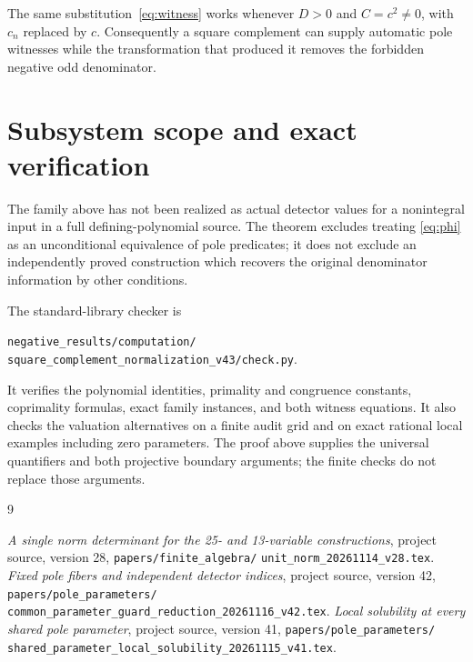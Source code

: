 \documentclass[11pt,a4paper]{article}
\begin{document}
The same substitution~\eqref{eq:witness} works whenever $D>0$ and
$C=c^2\ne0$, with $c_n$ replaced by $c$. Consequently a square
complement can supply automatic pole witnesses while the transformation
that produced it removes the forbidden negative odd denominator.

\newpage
\section{Subsystem scope and exact verification}

The family above has not been realized as actual detector values for a
nonintegral input in a full defining-polynomial source. The theorem
excludes treating \eqref{eq:phi} as an unconditional equivalence of pole
predicates; it does not exclude an independently proved construction
which recovers the original denominator information by other conditions.

The standard-library checker is
\begin{center}\small
\texttt{negative\_results/computation/}\\
\texttt{square\_complement\_normalization\_v43/check.py}.
\end{center}
It verifies the polynomial identities, primality and congruence
constants, coprimality formulas, exact family instances, and both witness
equations. It also checks the valuation alternatives on a finite audit
grid and on exact rational local examples including zero parameters.
The proof above supplies the universal quantifiers and both projective
boundary arguments; the finite checks do not replace those arguments.

\begin{thebibliography}{9}
\raggedright
{}
\emph{A single norm determinant for the 25- and 13-variable constructions},
project source, version 28,
\texttt{papers/finite\_algebra/}\allowbreak
\texttt{unit\_norm\_20261114\_v28.tex}.
\emph{Fixed pole fibers and independent detector indices},
project source, version 42,
\texttt{papers/pole\_parameters/}\allowbreak
\texttt{common\_parameter\_guard\_reduction\_20261116\_v42.tex}.
\emph{Local solubility at every shared pole parameter},
project source, version 41,
\texttt{papers/pole\_parameters/}\allowbreak
\texttt{shared\_parameter\_local\_solubility\_20261115\_v41.tex}.
\end{thebibliography}
\end{document}

